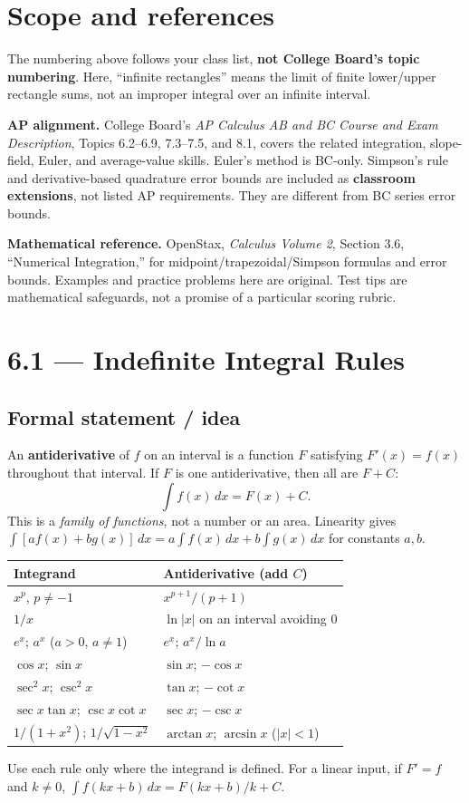\documentclass[11pt]{article}
\newcommand{\topic}[2]{\clearpage\section*{#1 --- #2}}
\newcommand{\dx}{\,dx}
\begin{document}
\section*{Scope and references}
The numbering above follows your class list, \textbf{not College Board's topic numbering}. Here, ``infinite rectangles'' means the limit of finite lower/upper rectangle sums, not an improper integral over an infinite interval.

\textbf{AP alignment.} College Board's \emph{AP Calculus AB and BC Course and Exam Description}, Topics 6.2--6.9, 7.3--7.5, and 8.1, covers the related integration, slope-field, Euler, and average-value skills. Euler's method is BC-only. Simpson's rule and derivative-based quadrature error bounds are included as \textbf{classroom extensions}, not listed AP requirements. They are different from BC series error bounds.

\textbf{Mathematical reference.} OpenStax, \emph{Calculus Volume 2}, Section 3.6, ``Numerical Integration,'' for midpoint/trapezoidal/Simpson formulas and error bounds. Examples and practice problems here are original. Test tips are mathematical safeguards, not a promise of a particular scoring rubric.

\topic{6.1}{Indefinite Integral Rules}
\subsection*{Formal statement / idea}
An \textbf{antiderivative} of $f$ on an interval is a function $F$ satisfying $F'(x)=f(x)$ throughout that interval. If $F$ is one antiderivative, then all are $F+C$:
\[
\int f(x)\dx=F(x)+C.
\]
This is a \emph{family of functions}, not a number or an area. Linearity gives
$\int[af(x)+bg(x)]\dx=a\int f(x)\dx+b\int g(x)\dx$ for constants $a,b$.

\begin{center}
\renewcommand{\arraystretch}{1.2}
\begin{tabular}{ll}
\textbf{Integrand} & \textbf{Antiderivative (add $C$)}\\ \hline
$x^p$, $p\ne-1$ & $x^{p+1}/(p+1)$\\
$1/x$ & $\ln|x|$ on an interval avoiding $0$\\
$e^x$; $a^x$ ($a>0$, $a\ne1$) & $e^x$; $a^x/\ln a$\\
$\cos x$; $\sin x$ & $\sin x$; $-\cos x$\\
$\sec^2x$; $\csc^2x$ & $\tan x$; $-\cot x$\\
$\sec x\tan x$; $\csc x\cot x$ & $\sec x$; $-\csc x$\\
$1/(1+x^2)$; $1/\sqrt{1-x^2}$ & $\arctan x$; $\arcsin x$ ($|x|<1$)
\end{tabular}
\end{center}
Use each rule only where the integrand is defined. For a linear input, if $F'=f$ and $k\ne0$,
$\int f(kx+b)\dx=F(kx+b)/k+C$.
\end{document}
